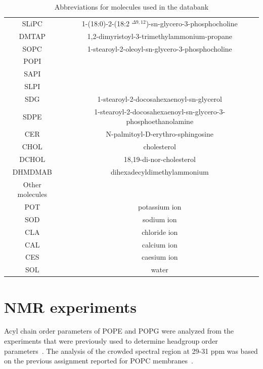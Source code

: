 \documentclass[fleqn,10pt]{wlscirep}
\begin{document}
\begin{table}[p]
\begin{tabular}{c c}
    SLiPC & 1-(18:0)-2-(18:2 $^{\Delta9,12}$)-sn-glycero-3-phosphocholine  \\
    DMTAP & 1,2-dimyristoyl-3-trimethylammonium-propane \\
    SOPC & 1-stearoyl-2-oleoyl-sn-glycero-3-phosphocholine \\
    POPI & \\ 
    SAPI & \\
    SLPI &  \\
    SDG & 1-stearoyl-2-docosahexaenoyl-sn-glycerol \\
    SDPE & 1-stearoyl-2-docosahexaenoyl-sn-glycero-3-phosphoethanolamine \\
    CER  & N-palmitoyl-D-erythro-sphingosine \\
    CHOL & cholesterol  \\
    DCHOL & 18,19-di-nor-cholesterol \\
    DHMDMAB & dihexadecyldimethylammonium  \\
    \hline
    Other molecules & \\
    \hline
    POT & potassium ion  \\
    SOD & sodium ion  \\
    CLA & chloride ion \\
    CAL & calcium ion  \\
    CES & caesium ion \\
    SOL & water  \\
    \end{tabular}
    \caption{Abbreviations for molecules used in the databank}
    \label{tab:abbreviations}
\end{table}




\clearpage
\section{NMR experiments}
Acyl chain order parameters of POPE and POPG were analyzed from the experiments that were previously used to determine headgroup order parameters~\cite{bacle21}. The analysis of the crowded spectral region at 29-31 ppm was based on the previous assignment reported for POPC membranes~\cite{ferreira13}. 
\end{document}
